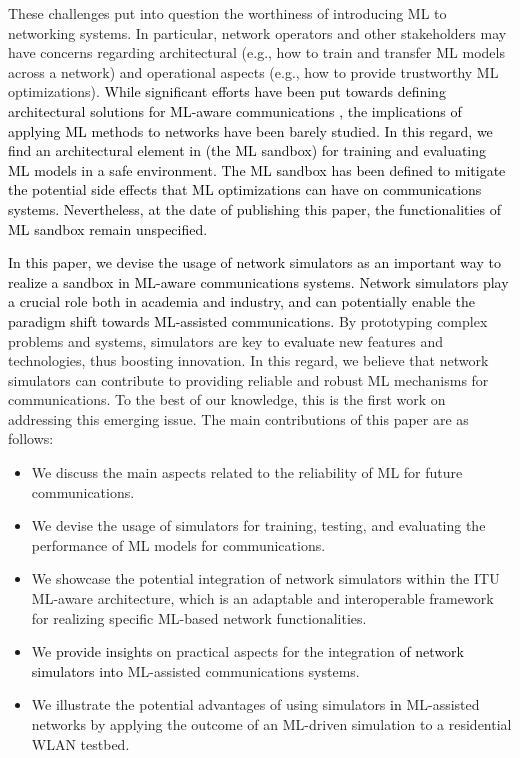 \documentclass[journal]{IEEEtran}
\begin{document}
	These challenges put into question the worthiness of introducing ML to networking systems. In particular, network operators and other stakeholders may have concerns regarding architectural (e.g., how to train and transfer ML models across a network) and operational aspects (e.g., how to provide trustworthy ML optimizations). \textcolor{black}{While significant efforts have been put towards defining architectural solutions for ML-aware communications \cite{3gpp2019study, ETSI, ITU3172, ITU3174}, the implications of applying ML methods to networks have been barely studied. In this regard, we find an architectural element in \cite{ITU3172} (the ML sandbox) for training and evaluating ML models in a safe environment. The ML sandbox has been defined to mitigate the potential side effects that ML optimizations can have \textcolor{black}{on} communications systems. Nevertheless, at the date of publishing this paper, the functionalities of ML sandbox remain unspecified.}

	\textcolor{black}{In this paper, we devise the usage of network simulators as an important way to realize a sandbox in ML-aware communications systems. Network simulators play a crucial role both in academia and industry, and can potentially enable the paradigm shift towards ML-assisted communications.} By prototyping complex problems and systems, simulators are key to \textcolor{black}{evaluate} new features and technologies, thus boosting innovation. In this regard, we believe that network simulators can contribute to providing reliable and robust ML mechanisms for communications. To the best of our knowledge, this is the first work on addressing this emerging issue. The main contributions of this paper are as follows:
	\begin{itemize}
		\item We discuss the main aspects related to the reliability of ML for future communications.
		\item We devise the usage of simulators for training, testing, and evaluating the performance of ML models for communications.
		\item We showcase the potential integration of network simulators within the ITU ML-aware architecture, which is an adaptable and interoperable framework for realizing specific ML-based network functionalities.
		\item We \textcolor{black}{provide insights} on practical aspects for the integration \textcolor{black}{of network simulators into} ML-assisted communications systems. 
		\item We illustrate the potential advantages of using simulators \textcolor{black}{in} ML-assisted networks by applying the outcome of an ML-driven simulation to a residential WLAN testbed.
	\end{itemize}
\end{document}
